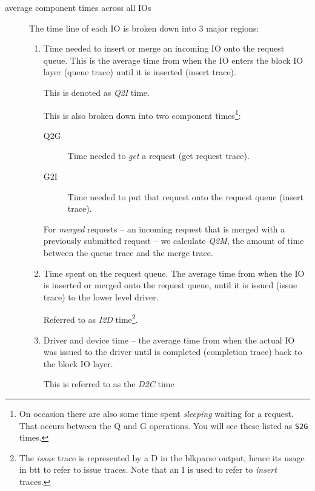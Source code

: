 \documentclass{article}
\begin{document}
\begin{description}
  \item[average component times across all IOs] The time line of each IO
  is broken down into 3 major regions:

    \begin{enumerate}
      \item Time needed to insert or merge an incoming IO onto the request
      queue. This is the average time from when the IO enters the block
      IO layer (queue trace) until it is inserted (insert trace).

      This is denoted as \emph{Q2I} time.

      This is also broken down into two component times\footnote{On
      occasion there are also some time spent \emph{sleeping} waiting
      for a request. That occurs between the Q and G operations. You
      will see these listed as \texttt{S2G} times.}:

        \begin{description}
	  \item[Q2G] Time needed to \emph{get} a request (get request
	  trace).

	  \item[G2I] Time needed to put that request onto the request
	  queue (insert trace).
        \end{description}

      For \emph{merged} requests -- an incoming request that is merged
      with a previously submitted request -- we calculate \emph{Q2M}, the
      amount of time between the queue trace and the merge trace.

      \item Time spent on the request queue. The average time from when
      the IO is inserted or merged onto the request queue, until it is
      issued (issue trace) to the lower level driver.

      Referred to as \emph{I2D} time\footnote{The \emph{issue} trace
      is represented by a D in the blkparse output, hence its usage in
      btt to refer to issue traces. Note that an I is used to refer to
      \emph{insert} traces.}.

      \item Driver and device time -- the average time from when the
      actual IO was issued to the driver until is completed (completion
      trace) back to the block IO layer.

      This is referred to as the \emph{D2C} time\
    \end{enumerate}


\end{description}
\end{document}
